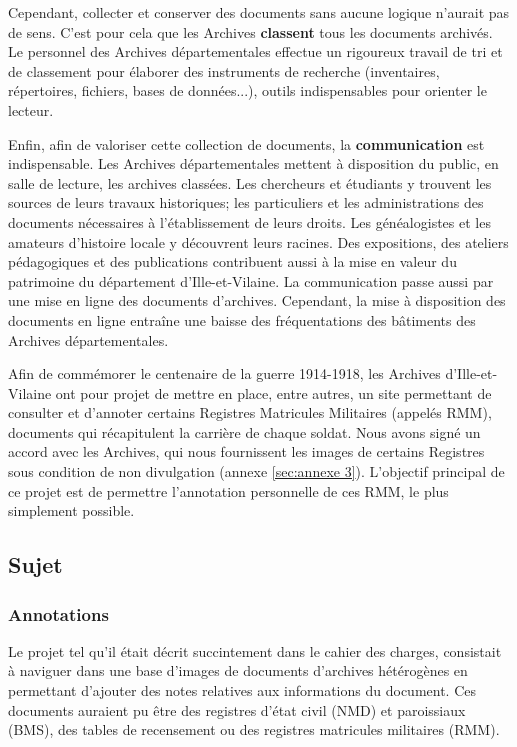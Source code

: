 \documentclass[a4paper]{article}
\begin{document}
	Cependant, collecter et conserver des documents sans aucune logique n'aurait pas de sens. C'est pour cela que les Archives \textbf{classent} tous les documents archiv\'es. Le personnel des Archives d\'epartementales effectue un rigoureux travail de tri et de classement pour \'elaborer des instruments de recherche (inventaires, r\'epertoires, fichiers, bases de donn\'ees...), outils indispensables pour orienter le lecteur.

	Enfin, afin de valoriser cette collection de documents, la \textbf{communication} est indispensable. Les Archives d\'epartementales mettent \`a disposition du public, en salle de lecture, les archives class\'ees. Les chercheurs et \'etudiants y trouvent les sources de leurs travaux historiques; les particuliers et les administrations des documents n\'ecessaires \`a l'\'etablissement de leurs droits.
Les g\'en\'ealogistes et les amateurs d'histoire locale y d\'ecouvrent leurs racines. Des expositions, des ateliers p\'edagogiques et des publications contribuent aussi \`a la mise en valeur du patrimoine du d\'epartement d'Ille-et-Vilaine. La communication passe aussi par une mise en ligne des documents d'archives. Cependant, la mise \`a disposition des documents en ligne entra\^ine une baisse des fr\'equentations des b\^atiments des Archives d\'epartementales.

    Afin de comm\'emorer le centenaire de la guerre 1914-1918, les Archives d'Ille-et-Vilaine ont pour projet de mettre en place, entre autres, un site permettant de consulter et d'annoter certains Registres Matricules Militaires (appel\'es RMM), documents qui r\'ecapitulent la carri\`ere de chaque soldat. Nous avons sign\'e un accord avec les Archives, qui nous fournissent les images de certains Registres sous condition de non divulgation (annexe \ref{sec:annexe 3}). L'objectif principal de ce projet est de permettre l'annotation personnelle de ces RMM, le plus simplement possible.
    
\subsection{Sujet}
\label{subsec:sujet}

\subsubsection{Annotations}
Le projet tel qu'il \'etait d\'ecrit succintement dans le cahier des charges, consistait \`a naviguer dans une base d'images de documents d'archives h\'et\'erog\`enes en permettant d'ajouter des notes relatives aux informations du document. Ces documents auraient pu \^etre des registres d'\'etat civil (NMD) et paroissiaux (BMS), des tables de recensement ou des registres matricules militaires (RMM).
\\
\end{document}
